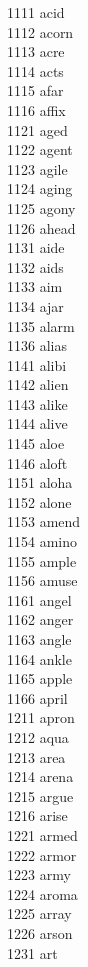 1111 acid \\
1112 acorn \\
1113 acre \\
1114 acts \\
1115 afar \\
1116 affix \\
1121 aged \\
1122 agent \\
1123 agile \\
1124 aging \\
1125 agony \\
1126 ahead \\
1131 aide \\
1132 aids \\
1133 aim \\
1134 ajar \\
1135 alarm \\
1136 alias \\
1141 alibi \\
1142 alien \\
1143 alike \\
1144 alive \\
1145 aloe \\
1146 aloft \\
1151 aloha \\
1152 alone \\
1153 amend \\
1154 amino \\
1155 ample \\
1156 amuse \\
1161 angel \\
1162 anger \\
1163 angle \\
1164 ankle \\
1165 apple \\
1166 april \\
1211 apron \\
1212 aqua \\
1213 area \\
1214 arena \\
1215 argue \\
1216 arise \\
1221 armed \\
1222 armor \\
1223 army \\
1224 aroma \\
1225 array \\
1226 arson \\
1231 art \\
